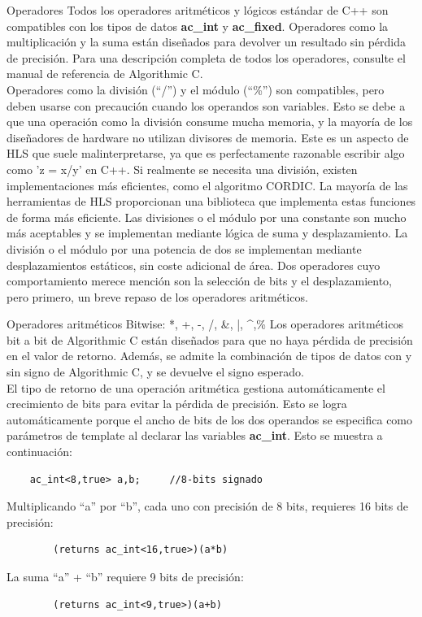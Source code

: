 \documentclass[11pt]{beamer}
\begin{document}
	\begin{frame}{Operadores}
	\justifying \footnotesize
	Todos los operadores aritméticos y lógicos estándar de C++ son compatibles con los tipos de datos \textbf{ac\_int} y \textbf{ac\_fixed}. Operadores como la multiplicación y la suma están diseñados para devolver un resultado sin pérdida de precisión. Para una descripción completa de todos los operadores, consulte el manual de referencia de Algorithmic C.\\Operadores como la división (``/'') y el módulo (``\%'') son compatibles, pero deben usarse con precaución cuando los operandos son variables. Esto se debe a que una operación como la división consume mucha memoria, y la mayoría de los diseñadores de hardware no utilizan divisores de memoria. Este es un aspecto de HLS que suele malinterpretarse, ya que es perfectamente razonable escribir algo como 'z = x/y' en C++. Si realmente se necesita una división, existen implementaciones más eficientes, como el algoritmo CORDIC. La mayoría de las herramientas de HLS proporcionan una biblioteca que implementa estas funciones de forma más eficiente. Las divisiones o el módulo por una constante son mucho más aceptables y se implementan mediante lógica de suma y desplazamiento. La división o el módulo por una potencia de dos se implementan mediante desplazamientos estáticos, sin coste adicional de área. Dos operadores cuyo comportamiento merece mención son la selección de bits y el desplazamiento, pero primero, un breve repaso de los operadores aritméticos.
	\end{frame}
	
	
	\begin{frame}[fragile]{Operadores aritméticos Bitwise: *, +, -, /, \&, |, \textasciicircum,\%}
		\justifying \small
	Los operadores aritméticos bit a bit de Algorithmic C están diseñados para que no haya pérdida de precisión en el valor de retorno. Además, se admite la combinación de tipos de datos con y sin signo de Algorithmic C, y se devuelve el signo esperado.	\\
	El tipo de retorno de una operación aritmética gestiona automáticamente el crecimiento de bits para evitar la pérdida de precisión. Esto se logra automáticamente porque el ancho de bits de los dos operandos se especifica como parámetros de template al declarar las variables \textbf{ac\_int}. Esto se muestra a continuación:
		
	\begin{lstlisting}
	ac_int<8,true> a,b; 	//8-bits signado	
	\end{lstlisting}
	Multiplicando ``a'' por ``b'', cada uno con precisión de 8 bits, requieres 16 bits de precisión:
	\begin{lstlisting}
		(returns ac_int<16,true>)(a*b)
	\end{lstlisting}
	La suma ``a'' + ``b'' requiere 9 bits de precisión:
	\begin{lstlisting}
		(returns ac_int<9,true>)(a+b)
	\end{lstlisting} 
		
	\end{frame}
	
\end{document}
